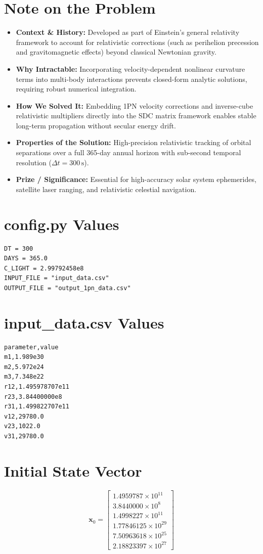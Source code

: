 \section{Note on the Problem}
\begin{itemize}
    \item \textbf{Context \& History:} Developed as part of Einstein's general relativity framework to account for relativistic corrections (such as perihelion precession and gravitomagnetic effects) beyond classical Newtonian gravity.
    \item \textbf{Why Intractable:} Incorporating velocity-dependent nonlinear curvature terms into multi-body interactions prevents closed-form analytic solutions, requiring robust numerical integration.
    \item \textbf{How We Solved It:} Embedding 1PN velocity corrections and inverse-cube relativistic multipliers directly into the SDC matrix framework enables stable long-term propagation without secular energy drift.
    \item \textbf{Properties of the Solution:} High-precision relativistic tracking of orbital separations over a full 365-day annual horizon with sub-second temporal resolution ($\Delta t = 300 \, \mathrm{s}$).
    \item \textbf{Prize / Significance:} Essential for high-accuracy solar system ephemerides, satellite laser ranging, and relativistic celestial navigation.
\end{itemize}

\section{config.py Values}
\begin{verbatim}
DT = 300
DAYS = 365.0
C_LIGHT = 2.99792458e8
INPUT_FILE = "input_data.csv"
OUTPUT_FILE = "output_1pn_data.csv"
\end{verbatim}

\section{input\_data.csv Values}
\begin{verbatim}
parameter,value
m1,1.989e30
m2,5.972e24
m3,7.348e22
r12,1.495978707e11
r23,3.84400000e8
r31,1.499822707e11
v12,29780.0
v23,1022.0
v31,29780.0
\end{verbatim}

\section{Initial State Vector}
\begin{equation}
\mathbf{x}_0 = \begin{bmatrix} 1.4959787 \times 10^{11} \\ 3.8440000 \times 10^8 \\ 1.4998227 \times 10^{11} \\ 1.77846125 \times 10^{29} \\ 7.50963618 \times 10^{25} \\ 2.18823397 \times 10^{27} \end{bmatrix}
\end{equation}

